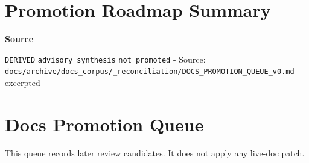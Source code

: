 \documentclass[10.5pt,a4paper,openany]{book}
\newcommand{\vonecallout}[3]{\par\medskip\noindent\begingroup\setlength{\fboxsep}{7pt}\colorbox{DomCalloutBg}{\parbox{0.94\linewidth}{\textbf{\textcolor{#1}{#2}}\par #3}}\endgroup\par\medskip}
\begin{document}
\section{Promotion Roadmap Summary}

\vonecallout{DomSlate}{Source}{\texttt{DERIVED} \texttt{advisory\_\allowbreak{}synthesis} \texttt{not\_\allowbreak{}promoted} -\allowbreak{} Source: \texttt{docs/\allowbreak{}archive/\allowbreak{}docs\_\allowbreak{}corpus/\allowbreak{}\_\allowbreak{}reconciliation/\allowbreak{}DOCS\_\allowbreak{}PROMOTION\_\allowbreak{}QUEUE\_\allowbreak{}v0.\allowbreak{}md} -\allowbreak{} excerpted}

\section{Docs Promotion Queue}

This queue records later review candidates.\allowbreak{} It does not apply any live-\allowbreak{}doc patch.\allowbreak{}
\end{document}
